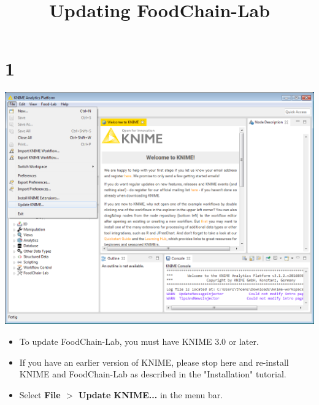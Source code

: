 \documentclass{beamer}
\title{Updating FoodChain-Lab}
\date{}
\begin{document}
\maketitle
 
\section{1}
\begin{frame}
	\begin{center}
  		\includegraphics[height=0.6\textheight]{1.png}
	\end{center}
	\begin{itemize}
		\item To update FoodChain-Lab, you must have KNIME 3.0 or later.
		\item If you have an earlier version of KNIME, please stop here and re-install KNIME and FoodChain-Lab as described in the "Installation" tutorial.
		\item Select \textbf{File $>$ Update KNIME...} in the menu bar.
	\end{itemize}
\end{frame}
\end{document}
